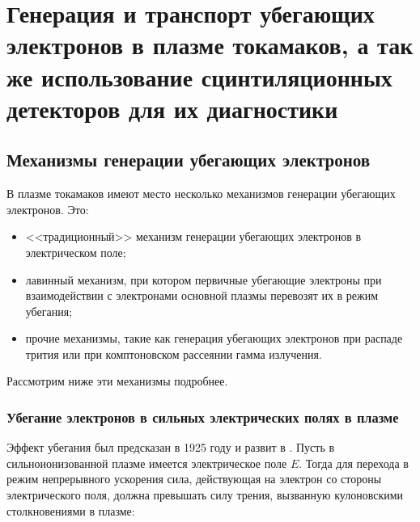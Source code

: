 

\chapter{Генерация и транспорт убегающих электронов в плазме токамаков, а так же использование сцинтиляционных детекторов для их диагностики}
\label{ch:ch1}


\section{Механизмы генерации убегающих электронов}\label{sec:ch1/sec1}

В плазме токамаков имеют место несколько механизмов генерации убегающих электронов. Это:

\begin{itemize}
  \item <<традиционный>> механизм генерации убегающих электронов в электрическом поле;
  \item лавинный механизм, при котором первичные убегающие электроны при взаимодействии с электронами основной плазмы перевозят их в режим убегания;
  \item прочие механизмы, такие как генерация убегающих электронов при распаде трития или при комптоновском рассеянии гамма излучения.
\end{itemize}

Рассмотрим ниже эти механизмы подробнее.


\subsection{Убегание электронов в сильных электрических полях в плазме}

Эффект убегания был предсказан в 1925 году \cite{Wilson1925} и развит в \cite{Dreicer1959}. Пусть в сильноионизованной плазме имеется электрическое поле $E$. Тогда для перехода в режим непрерывного ускорения сила, действующая на электрон со стороны электрического поля, должна превышать силу трения, вызванную кулоновскими столкновениями в плазме:

